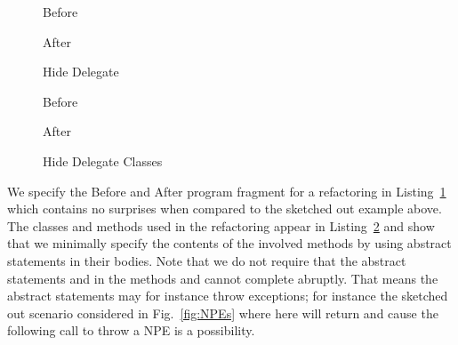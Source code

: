 \begin{figure}[tbp]
  \captionsetup{type=lstlisting}
  \centering
  \begin{sublstlisting}[b]{.455\linewidth}
    
    \caption{Before}
    \label{lst:HideDelegate-nofields-before-refinity}
  \end{sublstlisting}\hspace{1cm}
  \begin{sublstlisting}[b]{.455\linewidth}
    
    \caption{After}
    \label{lst:HideDelegate-nofields-after-refinity}
  \end{sublstlisting}
\caption{Hide Delegate}
\label{lst:HideDelegate-nofields-refinity}
\end{figure}

\begin{figure}[tbp]
  \captionsetup{type=lstlisting}
  \centering
  \begin{sublstlisting}[b]{.4\linewidth}
    
    \caption{Before}
    \label{lst:HideDelegate-nofields-resource-refinity}
  \end{sublstlisting}\hspace{1cm}
  \begin{sublstlisting}[b]{.4\linewidth}
    
    \caption{After}
    \label{lst:HideDelegate-nofields-owner-refinity}
  \end{sublstlisting}
\caption{Hide Delegate Classes}
\label{lst:HideDelegate-nofields-classes-refinity}
\end{figure}
We specify the Before and After program fragment for a  refactoring in Listing~\ref{lst:HideDelegate-nofields-refinity} which contains no surprises when compared to the sketched out example above.
The classes and methods used in the refactoring appear in Listing~\ref{lst:HideDelegate-nofields-classes-refinity} and show that we minimally specify the contents of the involved methods by using abstract
statements in their bodies.
Note that we do not require that the abstract statements  and  in the methods  and  cannot complete abruptly.
That means the abstract statements may for instance throw exceptions; for instance the sketched out scenario considered in Fig.~\ref{fig:NPEs} where here  will return  and cause the following call to throw a NPE is a possibility.

